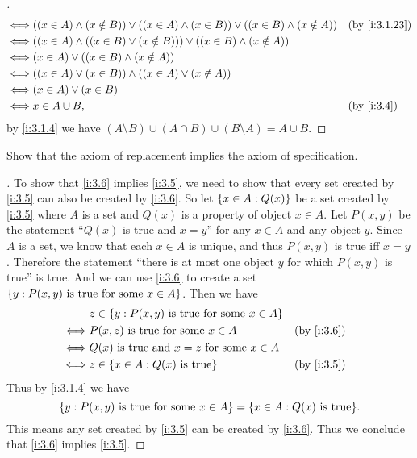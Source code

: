 \begin{proof}[]
\begin{align*}
    \iff & ((x \in A) \land (x \notin B)) \lor ((x \in A) \land (x \in B)) \lor ((x \in B) \land (x \notin A)) &  & \by{i:3.1.23} \\
    \iff & ((x \in A) \land ((x \in B) \lor (x \notin B))) \lor ((x \in B) \land (x \notin A))                                    \\
    \iff & (x \in A) \lor ((x \in B) \land (x \notin A))                                                                          \\
    \iff & ((x \in A) \lor (x \in B)) \land ((x \in A) \lor (x \notin A))                                                         \\
    \iff & (x \in A) \lor (x \in B)                                                                                               \\
    \iff & x \in A \cup B,                                                                                     &  & \by{i:3.4}
  \end{align*}
  by \cref{i:3.1.4} we have \((A \setminus B) \cup (A \cap B) \cup (B \setminus A) = A \cup B\).
\end{proof}

\begin{ex}\label{i:ex:3.1.11}
  Show that the axiom of replacement implies the axiom of specification.
\end{ex}

\begin{proof}[]
  To show that \cref{i:3.6} implies \cref{i:3.5}, we need to show that every set created by \cref{i:3.5} can also be created by \cref{i:3.6}.
  So let \(\left\lbrace x \in A : Q(x)\right\rbrace\) be a set created by \cref{i:3.5} where \(A\) is a set and \(Q(x)\) is a property of object \(x \in A\).
  Let \(P(x, y)\) be the statement ``\(Q(x)\) is true and \(x = y\)'' for any \(x \in A\) and any object \(y\).
  Since \(A\) is a set, we know that each \(x \in A\) is unique, and thus \(P(x, y)\) is true iff \(x = y\).
  Therefore the statement ``there is at most one object \(y\) for which \(P(x, y)\) is true'' is true.
  And we can use \cref{i:3.6} to create a set \(\left\lbrace y : P(x, y) \text{ is true for some } x \in A\right\rbrace\).
  Then we have
  \begin{align*}
         & z \in \set{y : P(x, y) \text{ is true for some } x \in A}                 \\
    \iff & P(x, z) \text{ is true for some } x \in A                 &  & \by{i:3.6} \\
    \iff & Q(x) \text{ is true and } x = z \text{ for some } x \in A                 \\
    \iff & z \in \set{x \in A : Q(x) \text{ is true}}                &  & \by{i:3.5}
  \end{align*}
  Thus by \cref{i:3.1.4} we have
  \[
    \set{y : P(x, y) \text{ is true for some } x \in A} = \set{x \in A : Q(x) \text{ is true}}.
  \]
  This means any set created by \cref{i:3.5} can be created by \cref{i:3.6}.
  Thus we conclude that \cref{i:3.6} implies \cref{i:3.5}.
\end{proof}
